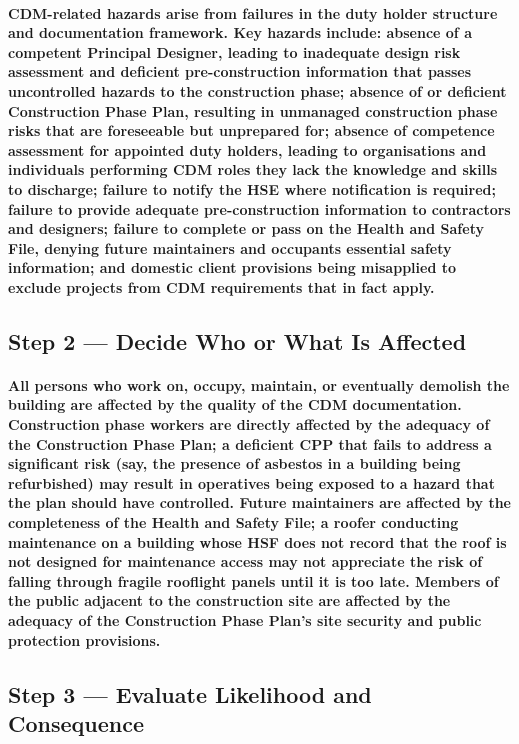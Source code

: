 \paragraph{CDM-related hazards arise from failures in the duty holder structure and documentation framework. Key hazards include: absence of a competent Principal Designer, leading to inadequate design risk assessment and deficient pre-construction information that passes uncontrolled hazards to the construction phase; absence of or deficient Construction Phase Plan, resulting in unmanaged construction phase risks that are foreseeable but unprepared for; absence of competence assessment for appointed duty holders, leading to organisations and individuals performing CDM roles they lack the knowledge and skills to discharge; failure to notify the HSE where notification is required; failure to provide adequate pre-construction information to contractors and designers; failure to complete or pass on the Health and Safety File, denying future maintainers and occupants essential safety information; and domestic client provisions being misapplied to exclude projects from CDM requirements that in fact apply.}

\subsection{Step 2 --- Decide Who or What Is Affected}
\paragraph{All persons who work on, occupy, maintain, or eventually demolish the building are affected by the quality of the CDM documentation. Construction phase workers are directly affected by the adequacy of the Construction Phase Plan; a deficient CPP that fails to address a significant risk (say, the presence of asbestos in a building being refurbished) may result in operatives being exposed to a hazard that the plan should have controlled. Future maintainers are affected by the completeness of the Health and Safety File; a roofer conducting maintenance on a building whose HSF does not record that the roof is not designed for maintenance access may not appreciate the risk of falling through fragile rooflight panels until it is too late. Members of the public adjacent to the construction site are affected by the adequacy of the Construction Phase Plan's site security and public protection provisions.}

\subsection{Step 3 --- Evaluate Likelihood and Consequence}
